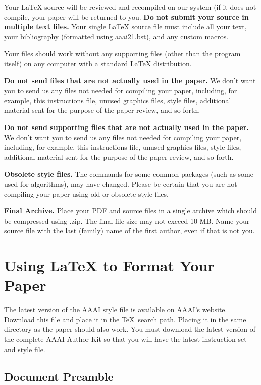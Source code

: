\documentclass[letterpaper]{article} \usepackage{aaai21}  \usepackage{times}  \usepackage{helvet} \usepackage{courier}  \usepackage[hyphens]{url}  \usepackage{graphicx} \urlstyle{rm} \def\UrlFont{\rm}  \usepackage{natbib}  \usepackage{caption} \frenchspacing  \setlength{\pdfpagewidth}{8.5in}  \setlength{\pdfpageheight}{11in}  \usepackage{cite}
\begin{document}
Your \LaTeX{} source will be reviewed and recompiled on our system (if it does not compile, your paper will be returned to you. \textbf{Do not submit your source in multiple text files.} Your single \LaTeX{} source file must include all your text, your bibliography (formatted using aaai21.bst), and any custom macros.

Your files should work without any supporting files (other than the program itself) on any computer with a standard \LaTeX{} distribution.

\textbf{Do not send files that are not actually used in the paper.} We don't want you to send us any files not needed for compiling your paper, including, for example, this instructions file, unused graphics files, style files, additional material sent for the purpose of the paper review, and so forth.

\textbf{Do not send supporting files that are not actually used in the paper.} We don't want you to send us any files not needed for compiling your paper, including, for example, this instructions file, unused graphics files, style files, additional material sent for the purpose of the paper review, and so forth.

\textbf{Obsolete style files.} The commands for some common packages (such as some used for algorithms), may have changed. Please be certain that you are not compiling your paper using old or obsolete style files.

\textbf{Final Archive.} Place your PDF and source files in a single archive which should be compressed using .zip. The final file size may not exceed 10 MB.
Name your source file with the last (family) name of the first author, even if that is not you.


\section{Using \LaTeX{} to Format Your Paper}

The latest version of the AAAI style file is available on AAAI's website. Download this file and place it in the \TeX\ search path. Placing it in the same directory as the paper should also work. You must download the latest version of the complete AAAI Author Kit so that you will have the latest instruction set and style file.

\subsection{Document Preamble}
\end{document}

